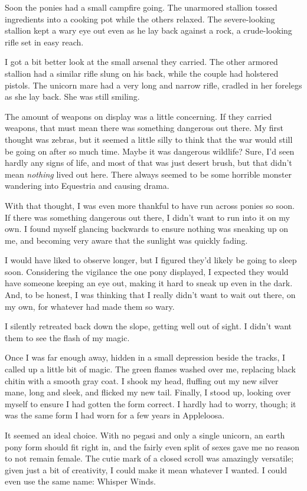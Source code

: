 Soon the ponies had a small campfire going. The unarmored stallion tossed ingredients into a cooking pot while the others relaxed. The severe-looking stallion kept a wary eye out even as he lay back against a rock, a crude-looking rifle set in easy reach.

I got a bit better look at the small arsenal they carried. The other armored stallion had a similar rifle slung on his back, while the couple had holstered pistols. The unicorn mare had a very long and narrow rifle, cradled in her forelegs as she lay back. She was still smiling.

The amount of weapons on display was a little concerning. If they carried weapons, that must mean there was something dangerous out there. My first thought was zebras, but it seemed a little silly to think that the war would still be going on after so much time. Maybe it was dangerous wildlife? Sure, I’d seen hardly any signs of life, and most of that was just desert brush, but that didn’t mean \textit{nothing} lived out here. There always seemed to be some horrible monster wandering into Equestria and causing drama.

With that thought, I was even more thankful to have run across ponies so soon. If there was something dangerous out there, I didn’t want to run into it on my own. I found myself glancing backwards to ensure nothing was sneaking up on me, and becoming very aware that the sunlight was quickly fading.

I would have liked to observe longer, but I figured they’d likely be going to sleep soon. Considering the vigilance the one pony displayed, I expected they would have someone keeping an eye out, making it hard to sneak up even in the dark. And, to be honest, I was thinking that I really didn’t want to wait out there, on my own, for whatever had made them so wary.

I silently retreated back down the slope, getting well out of sight. I didn’t want them to see the flash of my magic.

Once I was far enough away, hidden in a small depression beside the tracks, I called up a little bit of magic. The green flames washed over me, replacing black chitin with a smooth gray coat. I shook my head, fluffing out my new silver mane, long and sleek, and flicked my new tail. Finally, I stood up, looking over myself to ensure I had gotten the form correct. I hardly had to worry, though; it was the same form I had worn for a few years in Appleloosa.

It seemed an ideal choice. With no pegasi and only a single unicorn, an earth pony form should fit right in, and the fairly even split of sexes gave me no reason to not remain female. The cutie mark of a closed scroll was amazingly versatile; given just a bit of creativity, I could make it mean whatever I wanted. I could even use the same name: Whisper Winds.


